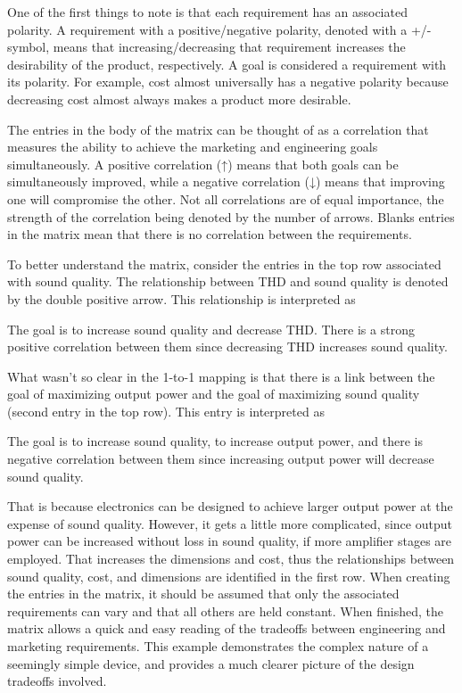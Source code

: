 One of the first things to note is that each requirement has an
associated polarity. A requirement with a positive/negative polarity,
denoted with a +/- symbol, means that increasing/decreasing that
requirement increases the desirability of the product, respectively. A
goal is considered a requirement with its polarity. For example, cost
almost universally has a negative polarity because decreasing cost
almost always makes a product more desirable.

The entries in the body of the matrix can be thought of as a correlation
that measures the ability to achieve the marketing and engineering goals
simultaneously. A positive correlation (↑) means that both goals can be
simultaneously improved, while a negative correlation (↓) means that
improving one will compromise the other. Not all correlations are of
equal importance, the strength of the correlation being denoted by the
number of arrows. Blanks entries in the matrix mean that there is no
correlation between the requirements.

To better understand the matrix, consider the entries in the top row
associated with sound quality. The relationship between THD and sound
quality is denoted by the double positive arrow. This relationship is
interpreted as

\begin{itquote}
The goal is to increase sound quality and decrease THD. There is a
strong positive correlation between them since decreasing THD increases
sound quality.
\end{itquote}

What wasn't so clear in the 1-to-1 mapping is that there is a link
between the goal of maximizing output power and the goal of maximizing
sound quality (second entry in the top row). This entry is interpreted
as

\begin{itquote}
The goal is to increase sound quality, to increase output power, and
there is negative correlation between them since increasing output power
will decrease sound quality.
\end{itquote}

That is because electronics can be designed to achieve larger output
power at the expense of sound quality. However, it gets a little more
complicated, since output power can be increased without loss in sound
quality, if more amplifier stages are employed. That increases the
dimensions and cost, thus the relationships between sound quality, cost,
and dimensions are identified in the first row. When creating the
entries in the matrix, it should be assumed that only the associated
requirements can vary and that all others are held constant. When
finished, the matrix allows a quick and easy reading of the tradeoffs
between engineering and marketing requirements. This example
demonstrates the complex nature of a seemingly simple device, and
provides a much clearer picture of the design tradeoffs involved.

